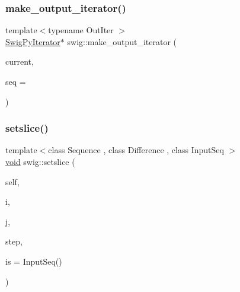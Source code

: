 \subsubsection{\texorpdfstring{make\+\_\+output\+\_\+iterator()}{make\_output\_iterator()}\hspace{0.1cm}{\footnotesize\ttfamily [2/2]}}
{\footnotesize\ttfamily template$<$typename Out\+Iter $>$ \\
\hyperlink{structswig_1_1_swig_py_iterator}{Swig\+Py\+Iterator}$\ast$ swig\+::make\+\_\+output\+\_\+iterator (\begin{DoxyParamCaption}\item[{const Out\+Iter \&}]{current,  }\item[{Py\+Object $\ast$}]{seq = {} }\end{DoxyParamCaption})\hspace{0.3cm}{\ttfamily [inline]}}

\mbox{\label{namespaceswig_a697380d209f2d60ec96b1b461779d181}} 
\subsubsection{\texorpdfstring{setslice()}{setslice()}}
{\footnotesize\ttfamily template$<$class Sequence , class Difference , class Input\+Seq $>$ \\
\hyperlink{lp__lib_8h_ac7828c7b2b31d2e11af17bdb6289c5d9}{void} swig\+::setslice (\begin{DoxyParamCaption}\item[{Sequence $\ast$}]{self,  }\item[{Difference}]{i,  }\item[{Difference}]{j,  }\item[{\hyperlink{libstructural__wrap__python_8cpp_a47424a8953c340f500027db7e6c00173}{Py\+\_\+ssize\+\_\+t}}]{step,  }\item[{const Input\+Seq \&}]{is = {\ttfamily InputSeq()} }\end{DoxyParamCaption})\hspace{0.3cm}{\ttfamily [inline]}}

\mbox{\label{namespaceswig_aa9b510369aeb29e93ad75379c3ea447d}} 
